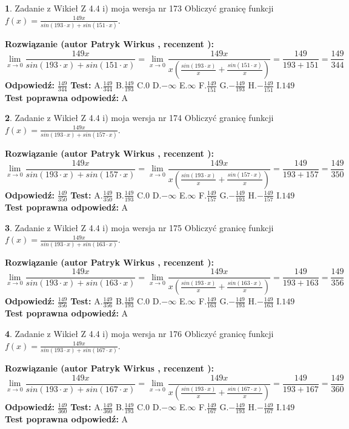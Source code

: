 \documentclass[12pt, a4paper]{article}
\theoremstyle{definition} %
\newtheorem{zad}{}
\newcommand{\zadStart}[1]{\begin{zad}#1\newline}
\newcommand{\zadStop}{\end{zad}}
\newcommand{\rozwStart}[2]{\noindent \textbf{Rozwiązanie (autor #1 , recenzent #2): }\newline}
\newcommand{\rozwStop}{\newline}
\newcommand{\odpStart}{\noindent \textbf{Odpowiedź:}\newline}
\newcommand{\odpStop}{\newline}
\newcommand{\testStart}{\noindent \textbf{Test:}\newline}
\newcommand{\testStop}{\newline}
\newcommand{\kluczStart}{\noindent \textbf{Test poprawna odpowiedź:}\newline}
\newcommand{\kluczStop}{\newline}
\begin{document}
\zadStart{Zadanie z Wikieł Z 4.4 i) moja wersja nr 173}
Obliczyć granicę funkcji $f(x)=\frac{149x}{sin(193\cdot x) +sin(151\cdot x)}$.
\zadStop
\rozwStart{Patryk Wirkus}{}
$$\lim\limits_{x\to 0}\frac{149x}{sin(193\cdot x) +sin(151\cdot x)}=\lim\limits_{x\to 0}\frac{149x}{x(\frac{sin(193\cdot x)}{x}+\frac{sin(151\cdot x)}{x})}=\frac{149}{193+151} = \frac{149}{344}$$
\rozwStop
\odpStart
$\frac{149}{344}$
\odpStop
\testStart
A.$\frac{149}{344}$
B.$\frac{149}{193}$
C.$0$
D.$-\infty$
E.$\infty$
F.$\frac{149}{151}$
G.$-\frac{149}{193}$
H.$-\frac{149}{151}$
I.$149$
\testStop
\kluczStart
A
\kluczStop



\zadStart{Zadanie z Wikieł Z 4.4 i) moja wersja nr 174}
Obliczyć granicę funkcji $f(x)=\frac{149x}{sin(193\cdot x) +sin(157\cdot x)}$.
\zadStop
\rozwStart{Patryk Wirkus}{}
$$\lim\limits_{x\to 0}\frac{149x}{sin(193\cdot x) +sin(157\cdot x)}=\lim\limits_{x\to 0}\frac{149x}{x(\frac{sin(193\cdot x)}{x}+\frac{sin(157\cdot x)}{x})}=\frac{149}{193+157} = \frac{149}{350}$$
\rozwStop
\odpStart
$\frac{149}{350}$
\odpStop
\testStart
A.$\frac{149}{350}$
B.$\frac{149}{193}$
C.$0$
D.$-\infty$
E.$\infty$
F.$\frac{149}{157}$
G.$-\frac{149}{193}$
H.$-\frac{149}{157}$
I.$149$
\testStop
\kluczStart
A
\kluczStop



\zadStart{Zadanie z Wikieł Z 4.4 i) moja wersja nr 175}
Obliczyć granicę funkcji $f(x)=\frac{149x}{sin(193\cdot x) +sin(163\cdot x)}$.
\zadStop
\rozwStart{Patryk Wirkus}{}
$$\lim\limits_{x\to 0}\frac{149x}{sin(193\cdot x) +sin(163\cdot x)}=\lim\limits_{x\to 0}\frac{149x}{x(\frac{sin(193\cdot x)}{x}+\frac{sin(163\cdot x)}{x})}=\frac{149}{193+163} = \frac{149}{356}$$
\rozwStop
\odpStart
$\frac{149}{356}$
\odpStop
\testStart
A.$\frac{149}{356}$
B.$\frac{149}{193}$
C.$0$
D.$-\infty$
E.$\infty$
F.$\frac{149}{163}$
G.$-\frac{149}{193}$
H.$-\frac{149}{163}$
I.$149$
\testStop
\kluczStart
A
\kluczStop



\zadStart{Zadanie z Wikieł Z 4.4 i) moja wersja nr 176}
Obliczyć granicę funkcji $f(x)=\frac{149x}{sin(193\cdot x) +sin(167\cdot x)}$.
\zadStop
\rozwStart{Patryk Wirkus}{}
$$\lim\limits_{x\to 0}\frac{149x}{sin(193\cdot x) +sin(167\cdot x)}=\lim\limits_{x\to 0}\frac{149x}{x(\frac{sin(193\cdot x)}{x}+\frac{sin(167\cdot x)}{x})}=\frac{149}{193+167} = \frac{149}{360}$$
\rozwStop
\odpStart
$\frac{149}{360}$
\odpStop
\testStart
A.$\frac{149}{360}$
B.$\frac{149}{193}$
C.$0$
D.$-\infty$
E.$\infty$
F.$\frac{149}{167}$
G.$-\frac{149}{193}$
H.$-\frac{149}{167}$
I.$149$
\testStop
\kluczStart
A
\kluczStop
\end{document}
